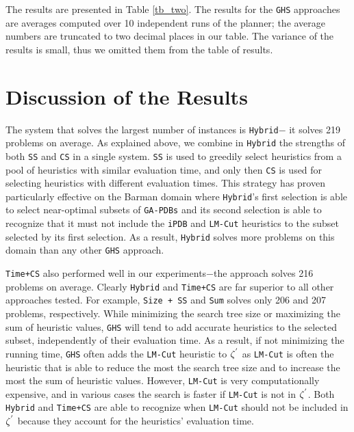 The results are presented in Table \ref{tb_two}. The results for the \texttt{GHS} approaches are averages computed over 10 independent runs of the planner; the average numbers are truncated to two decimal places in our table. The variance of the results is small, thus we omitted them from the table of results.

\section{Discussion of the Results}
\noindent
The system that solves the largest number of instances is \texttt{Hybrid}$-$ it solves 219 problems on average. As explained above, we combine in \texttt{Hybrid} the strengths of both \texttt{SS} and \texttt{CS} in a single system. \texttt{SS} is used to greedily select heuristics from a pool of heuristics with similar evaluation time, and only then \texttt{CS} is used for selecting heuristics with different evaluation times. This strategy has proven particularly effective on the Barman domain where \texttt{Hybrid}'s first selection is able to select near-optimal subsets of \texttt{GA-PDBs} and its second selection is able to recognize that it must not include the \texttt{iPDB} and \texttt{LM-Cut} heuristics to the subset selected by its first selection. As a result, \texttt{Hybrid} solves more problems on this domain than any other \texttt{GHS} approach.

\texttt{Time+CS} also performed well in our experiments$-$the approach solves 216 problems on average. Clearly \texttt{Hybrid} and \texttt{Time+CS} are far superior to all other approaches tested. For example, \texttt{Size + SS} and \texttt{Sum} solves only 206 and 207 problems, respectively. While minimizing the search tree size or maximizing the sum of heuristic values, \texttt{GHS} will tend to add accurate heuristics to the selected subset, independently of their evaluation time. As a result, if not minimizing the running time, \texttt{GHS} often adds the \texttt{LM-Cut} heuristic to $\zeta\sp{'}$ as \texttt{LM-Cut} is often the heuristic that is able to reduce the most the search tree size and to increase the most the sum of heuristic values. However, \texttt{LM-Cut} is very computationally expensive, and in various cases the search is faster if \texttt{LM-Cut} is not in $\zeta\sp{'}$. Both \texttt{Hybrid} and \texttt{Time+CS} are able to recognize when \texttt{LM-Cut} should not be included in $\zeta\sp{'}$ because they account for the heuristics' evaluation time.

